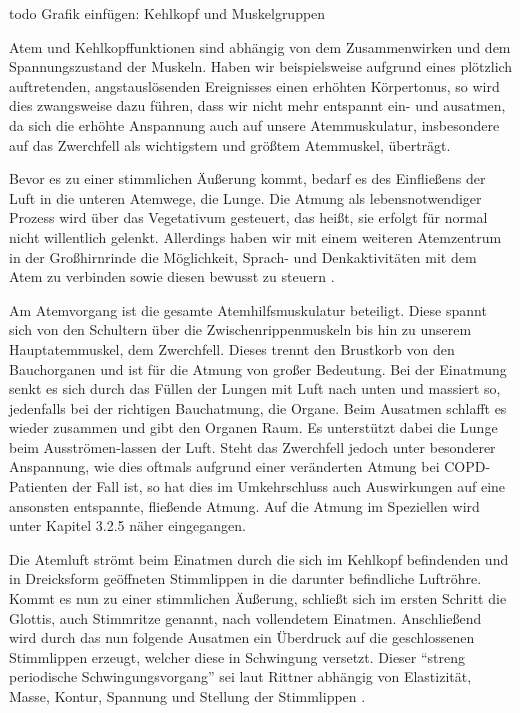 todo Grafik einfügen: Kehlkopf und Muskelgruppen

Atem und Kehlkopffunktionen sind abhängig von dem Zusammenwirken und dem Spannungszustand der Muskeln. Haben wir beispielsweise aufgrund eines plötzlich auftretenden, angstauslösenden Ereignisses einen erhöhten Körpertonus, so wird dies zwangsweise dazu führen, dass wir nicht mehr entspannt ein- und ausatmen, da sich die erhöhte Anspannung auch auf unsere Atemmuskulatur, insbesondere auf das Zwerchfell als wichtigstem und größtem Atemmuskel, überträgt. 

Bevor es zu einer stimmlichen Äußerung kommt, bedarf es des Einfließens der Luft in die unteren Atemwege, die Lunge. Die Atmung als lebensnotwendiger Prozess wird über das Vegetativum gesteuert, das heißt, sie erfolgt für normal nicht willentlich gelenkt. Allerdings haben wir mit einem weiteren Atemzentrum in der Großhirnrinde die Möglichkeit, Sprach- und Denkaktivitäten mit dem Atem zu verbinden sowie diesen bewusst zu steuern \autocite[vgl.][2]{ehrmann2004}. 

Am Atemvorgang ist die gesamte Atemhilfsmuskulatur beteiligt. Diese spannt sich von den Schultern über die Zwischenrippenmuskeln bis hin zu unserem Hauptatemmuskel, dem Zwerchfell. Dieses trennt den Brustkorb von den Bauchorganen und ist für die Atmung von großer Bedeutung. Bei der Einatmung senkt es sich durch das Füllen der Lungen mit Luft nach unten und massiert so, jedenfalls bei der richtigen Bauchatmung, die Organe. Beim Ausatmen schlafft es wieder zusammen und gibt den Organen Raum. Es unterstützt dabei die Lunge beim Ausströmen-lassen der Luft. Steht das Zwerchfell jedoch unter besonderer Anspannung, wie dies oftmals aufgrund einer veränderten Atmung bei COPD-Patienten der Fall ist, so hat dies im Umkehrschluss auch Auswirkungen auf eine ansonsten entspannte, fließende Atmung. Auf die Atmung im Speziellen wird unter Kapitel 3.2.5 näher eingegangen. 

Die Atemluft strömt beim Einatmen durch die sich im Kehlkopf befindenden und in Dreicksform geöffneten Stimmlippen in die darunter befindliche Luftröhre. Kommt es nun zu einer stimmlichen Äußerung, schließt sich im ersten Schritt die Glottis, auch Stimmritze genannt, nach vollendetem Einatmen. Anschließend wird durch das nun folgende Ausatmen ein Überdruck auf die geschlossenen Stimmlippen erzeugt, welcher diese in Schwingung versetzt. Dieser "`streng periodische Schwingungsvorgang"' \autocite[481]{rittner2009a} sei laut Rittner abhängig von Elastizität, Masse, Kontur, Spannung und Stellung der Stimmlippen \autocite[vgl.][481]{rittner2009a}.

